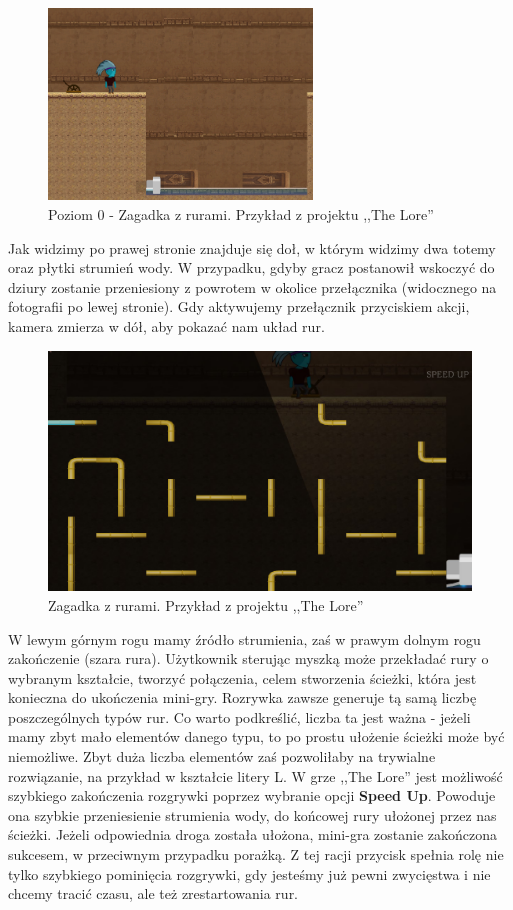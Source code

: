 \documentclass[oneside,polski,logo]{amuthesis}
\begin{document}
\begin{figure}[h]
	\centering
	\includegraphics[width=7cm]{images/tyrek/ruryLvl0.png}
	\caption{Poziom 0 - Zagadka z rurami. Przykład z projektu ,,The Lore''}
\end{figure}

Jak widzimy po prawej stronie znajduje się doł, w którym widzimy dwa totemy oraz płytki strumień wody. W przypadku, gdyby gracz postanowił wskoczyć do dziury zostanie przeniesiony z powrotem w okolice przełącznika (widocznego na fotografii po lewej stronie). Gdy aktywujemy przełącznik przyciskiem akcji, kamera zmierza w dół, aby pokazać nam układ rur.

\begin{figure}[h]
	\centering
	\includegraphics[width=12cm]{images/tyrek/pipes.png}
	\caption{Zagadka z rurami. Przykład z projektu ,,The Lore''}
\end{figure}

W lewym górnym rogu mamy źródło strumienia, zaś w prawym dolnym rogu zakończenie (szara rura). Użytkownik sterując myszką może przekładać rury o wybranym kształcie, tworzyć połączenia, celem stworzenia ścieżki, która jest konieczna do ukończenia mini-gry. Rozrywka zawsze generuje tą samą liczbę poszczególnych typów rur. Co warto podkreślić, liczba ta jest ważna - jeżeli mamy zbyt mało elementów danego typu, to po prostu ułożenie ścieżki może być niemożliwe. Zbyt duża liczba elementów zaś pozwoliłaby na trywialne rozwiązanie, na przykład w kształcie litery L. W grze ,,The Lore'' jest możliwość szybkiego zakończenia rozgrywki poprzez wybranie opcji \textbf{Speed Up}. Powoduje ona szybkie przeniesienie strumienia wody, do końcowej rury ułożonej przez nas ścieżki. Jeżeli odpowiednia droga została ułożona, mini-gra zostanie zakończona sukcesem, w przeciwnym przypadku porażką. Z tej racji przycisk spełnia rolę nie tylko szybkiego pominięcia rozgrywki, gdy jesteśmy już pewni zwycięstwa i nie chcemy tracić czasu, ale też zrestartowania rur. 
\end{document}
